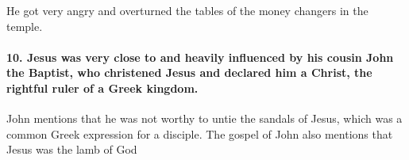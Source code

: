 He got very angry and overturned the tables of the money changers in the temple.

\paragraph{10.
Jesus was very close to and heavily influenced by his cousin John the Baptist, who christened Jesus and declared him a Christ, the rightful ruler of a Greek kingdom.}\label{par:jesus-was-very-close-to-and-heavily-influenced-by-his-cousin-john-the-baptist-who-christened-jesus-and-declared-him-a-christ-the-rightful-ruler-of-a-greek-kingdom.}

John mentions that he was not worthy to untie the sandals of Jesus, which was a common Greek expression for a disciple.
The gospel of John also mentions that Jesus was the lamb of God
